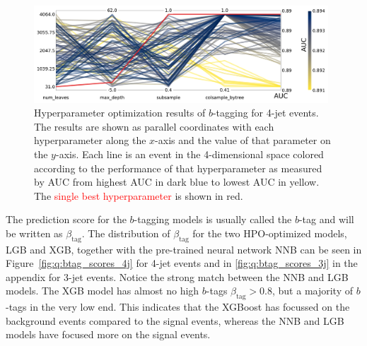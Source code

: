 \begin{figure}
  \includegraphics[width=0.98\textwidth, trim=0 0 0 0, clip]{figures/quarks/CV_viz-njet=4-name=lf_lgb_down_sample=1.00-ML_vars=vertex-selection=b-ejet_min=4-n_iter_RS_lgb=99-n_iter_RS_xgb=9-cdot_cut=0.90-version=19.pdf}
  \caption[Parallel Plot of HPO Results for 4-Jet $b$-Tagging]
          {Hyperparameter optimization results of $b$-tagging for 4-jet events. The results are shown as parallel coordinates with each hyperparameter along the $x$-axis and the value of that parameter on the $y$-axis. Each line is an event in the 4-dimensional space colored according to the performance of that hyperparameter as measured by AUC from \textcolor{viridis-dark}{highest} AUC in dark blue to \textcolor{viridis-light}{lowest} AUC in yellow. The \textcolor{red}{single best hyperparameter} is shown in red. 
          } 
  \label{fig:q:initial_CV_res_parallel_coords_4j}
\end{figure}

The prediction score for the $b$-tagging models is usually called the $b$-tag and will be written as $\beta_\mathrm{tag}$. The distribution of $\beta_\mathrm{tag}$ for the two HPO-optimized models, LGB and XGB, together with the pre-trained neural network NNB can be seen in Figure~\ref{fig:q:btag_scores_4j} for 4-jet events and in \ref{fig:q:btag_scores_3j} in the appendix for 3-jet events. Notice the strong match between the NNB and LGB models. The XGB model has almost no high $b$-tags $\beta_\mathrm{tag} > 0.8$, but a majority of $b$-tags in the very low end. This indicates that the XGBoost has focussed on the background events compared to the signal events, whereas the NNB and LGB models have focused more on the signal events. 

